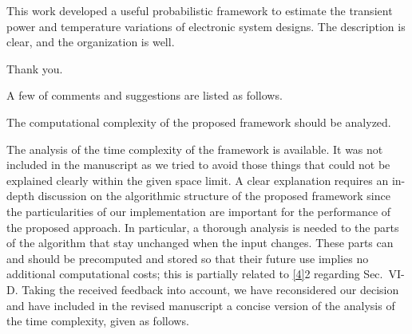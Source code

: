 \begin{reviewer}
This work developed a useful probabilistic framework to estimate the transient power and temperature variations of electronic system designs. The description is clear, and the organization is well.
\end{reviewer}
\begin{authors}
Thank you.
\end{authors}

\begin{reviewer}
A few of comments and suggestions are listed as follows.

The computational complexity of the proposed framework should be analyzed.
\end{reviewer}
\begin{authors}
The analysis of the time complexity of the framework is available.
It was not included in the manuscript as we tried to avoid those things that could not be explained clearly within the given space limit.
A clear explanation requires an in-depth discussion on the algorithmic structure of the proposed framework since the particularities of our implementation are important for the performance of the proposed approach.
In particular, a thorough analysis is needed to the parts of the algorithm that stay unchanged when the input changes.
These parts can and should be precomputed and stored so that their future use implies no additional computational costs; this is partially related to \cref{4}{2} regarding Sec.~VI-D.
Taking the received feedback into account, we have reconsidered our decision and have included in the revised manuscript a concise version of the analysis of the time complexity, given as follows.


\end{authors}
